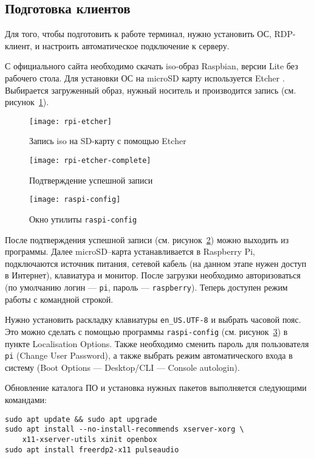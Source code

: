 \clearpage
\subsection{Подготовка клиентов}

Для того, чтобы подготовить к работе терминал, нужно установить ОС, RDP-клиент, и 
настроить автоматическое подключение к серверу.

С официального сайта \cite{ref:raspbian} необходимо скачать iso-образ Raspbian, версии
Lite без рабочего стола. Для установки ОС на microSD карту используется Etcher
\cite{ref:etcher}. Выбирается загруженный образ, нужный носитель и производится запись
(см. рисунок~\ref{pic:rpi-etcher}).

\begin{figure}[h]
    \center
    \texttt{[image: rpi-etcher]}
    \caption{Запись iso на SD-карту с помощью Etcher}
    \label{pic:rpi-etcher}
\end{figure}

\begin{figure}[h]
    \center
    \texttt{[image: rpi-etcher-complete]}
    \caption{Подтверждение успешной записи}
    \label{pic:rpi-etcher-complete}
\end{figure}

\begin{figure}[h]
    \center
    \texttt{[image: raspi-config]}
    \caption{Окно утилиты \texttt{raspi-config}}
    \label{pic:raspi-config}
\end{figure}

После подтверждения успешной записи (см. рисунок~\ref{pic:rpi-etcher-complete}) можно
выходить из программы. Далее microSD–карта устанавливается в Raspberry Pi, подключаются
источник питания, сетевой кабель (на данном этапе нужен доступ в Интернет), клавиатура 
и монитор. После загрузки необходимо авторизоваться (по умолчанию логин — 
\texttt{pi}, пароль — \texttt{raspberry}). Теперь доступен режим работы с командной
строкой.

Нужно установить раскладку клавиатуры \texttt{en\_US.UTF-8} и выбрать часовой пояс. Это
можно сделать с помощью программы \texttt{raspi-config} (см.
рисунок~\ref{pic:raspi-config}) в пункте Localisation Options.  Также необходимо сменить
пароль для пользователя \texttt{pi} (Change User Password), а также выбрать режим
автоматического входа в систему (Boot Options — Desktop/CLI — Console autologin).

Обновление каталога ПО и установка нужных пакетов выполняется следующими командами:
\begin{verbatim}
sudo apt update && sudo apt upgrade
sudo apt install --no-install-recommends xserver-xorg \
    x11-xserver-utils xinit openbox
sudo apt install freerdp2-x11 pulseaudio
\end{verbatim}

